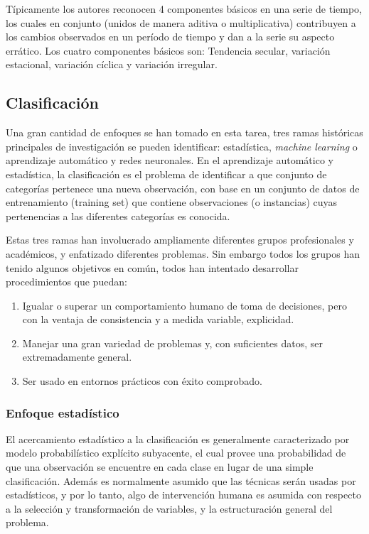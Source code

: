 Típicamente los autores reconocen 4 componentes básicos en una serie de tiempo, los cuales en conjunto (unidos de manera aditiva o multiplicativa) contribuyen a los cambios observados en un período de tiempo y dan a la serie su aspecto errático.
Los cuatro componentes básicos son: Tendencia secular, variación estacional, variación cíclica y variación irregular.

\subsection{Clasificación}

Una gran cantidad de enfoques se han tomado en esta tarea, tres ramas históricas principales de investigación se pueden identificar: estadística, \textit{machine learning} o aprendizaje automático y redes neuronales. 
En el aprendizaje automático y estadística, la clasificación es el problema de identificar a que conjunto de categorías pertenece una nueva observación, con base en un conjunto de datos de entrenamiento (training set) que contiene observaciones  (o instancias) cuyas pertenencias a las diferentes categorías es conocida.

Estas tres ramas han involucrado ampliamente diferentes grupos profesionales y académicos, y enfatizado diferentes problemas.
Sin embargo todos los grupos han tenido algunos objetivos en común, todos han intentado desarrollar procedimientos que puedan:

\begin{enumerate}
	\item Igualar o superar un comportamiento humano de toma de decisiones, pero con la ventaja de consistencia y a medida variable, explicidad.
	\item Manejar una gran variedad de problemas y, con suficientes datos, ser extremadamente general.
	\item Ser usado en entornos prácticos con éxito comprobado.
\end{enumerate}

\subsubsection{Enfoque estadístico}
El acercamiento estadístico a la clasificación es generalmente caracterizado por modelo probabilístico explícito subyacente, el cual provee una probabilidad de que una observación se encuentre en cada clase en lugar de una simple clasificación. Además es normalmente asumido que las técnicas serán usadas por estadísticos, y por lo tanto, algo de intervención humana es asumida con respecto a la selección y transformación de variables, y la estructuración general del problema.

